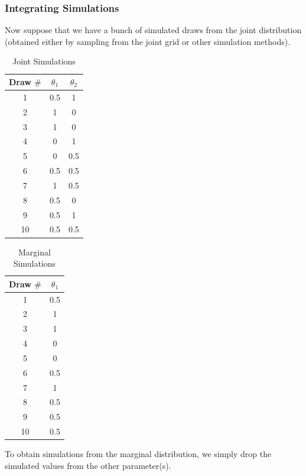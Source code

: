 \documentclass[handout]{beamer}
\begin{document}
\begin{frame}
\frametitle{Integrating Simulations}
\pause
Now suppose that we have a bunch of simulated draws from the joint
distribution (obtained either by sampling from the joint grid or other
simulation methods).

\begin{multicols}{2}
\scriptsize
\begin{table}[!htp]
\begin{center}
\caption{Joint Simulations}
\begin{tabular}{|c|c|c|}
\hline
Draw $\#$  & $\theta_1$ & $\theta_2$\\
\hline
1 & 0.5 & 1\\
2 & 1 & 0\\
3 & 1 & 0\\
4 & 0 & 1\\
5 & 0 & 0.5\\
6 & 0.5 & 0.5\\
7 & 1 & 0.5\\
8 & 0.5 & 0\\
9 & 0.5 & 1\\
10 & 0.5 & 0.5\\
\hline
\end{tabular}
\end{center}
\end{table}

\pause
\begin{table}[!htp]
\begin{center}
\caption{Marginal Simulations}
\begin{tabular}{|c|c|}
\hline
Draw $\#$  & $\theta_1$ \\
\hline
1 & 0.5 \\
2 & 1 \\
3 & 1 \\
4 & 0 \\
5 & 0 \\
6 & 0.5 \\
7 & 1 \\
8 & 0.5 \\
9 & 0.5 \\
10 & 0.5 \\
\hline
\end{tabular}
\end{center}
\end{table}
\end{multicols}
\pause
To obtain simulations from the marginal distribution, we simply drop
the simulated values from the other parameter(s).
\end{frame}
\end{document}
